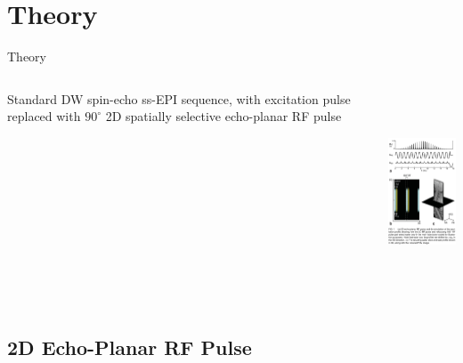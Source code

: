 \documentclass{beamer}
\begin{document}
\section{Theory}

\begin{frame}{Theory}
\begin{columns}[T]
	\begin{column}[T]{5cm}
		Standard DW spin-echo ss-EPI sequence, with excitation pulse replaced with $90^{\circ}$ 2D spatially selective echo-planar RF pulse
	\end{column}
	\begin{column}[T]{5cm}
		\includegraphics[height=6cm]{SpineDWIfig1}
	\end{column}
\end{columns}
\end{frame}

\subsection{2D Echo-Planar RF Pulse}
\end{document}

